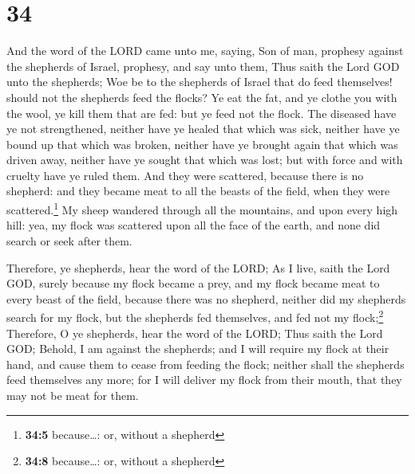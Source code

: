 \hypertarget{section-33}{%
\section{34}\label{section-33}}

 And the word of the LORD came unto me, saying,
 Son of man, prophesy against the shepherds of Israel,
prophesy, and say unto them, Thus saith the Lord GOD unto the shepherds;
Woe be to the shepherds of Israel that do feed themselves! should not
the shepherds feed the flocks?  Ye eat the fat, and ye
clothe you with the wool, ye kill them that are fed: but ye feed not the
flock.  The diseased have ye not strengthened, neither
have ye healed that which was sick, neither have ye bound up that which
was broken, neither have ye brought again that which was driven away,
neither have ye sought that which was lost; but with force and with
cruelty have ye ruled them.  And they were scattered,
because there is no shepherd: and they became meat to all the beasts of
the field, when they were scattered.\footnote{\textbf{34:5}
  because\ldots: or, without a shepherd}  My sheep
wandered through all the mountains, and upon every high hill: yea, my
flock was scattered upon all the face of the earth, and none did search
or seek after them.

 Therefore, ye shepherds, hear the word of the LORD;
 As I live, saith the Lord GOD, surely because my flock
became a prey, and my flock became meat to every beast of the field,
because there was no shepherd, neither did my shepherds search for my
flock, but the shepherds fed themselves, and fed not my
flock;\footnote{\textbf{34:8} because\ldots: or, without a shepherd}
 Therefore, O ye shepherds, hear the word of the LORD;
 Thus saith the Lord GOD; Behold, I am against the
shepherds; and I will require my flock at their hand, and cause them to
cease from feeding the flock; neither shall the shepherds feed
themselves any more; for I will deliver my flock from their mouth, that
they may not be meat for them.

